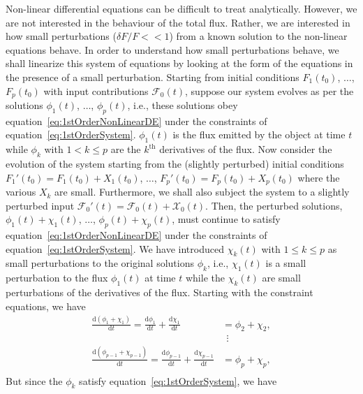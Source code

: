 \documentclass[a4paper,fleqn,usenatbib]{mnras}
\begin{document}
Non-linear differential equations can be difficult to treat analytically. However, we are not interested in the behaviour of the total flux. Rather, we are interested in how small perturbations ($\delta F/F << 1$) from a known solution to the non-linear equations behave. In order to understand how small perturbations behave, we shall linearize this system of equations by looking at the form of the equations in the presence of a small perturbation. Starting from initial conditions $F_{1}(t_{0})$, $\ldots$, $F_{p}(t_{0})$ with input contributions $\mathcal{F}_{0}(t)$, suppose our system evolves as per the solutions $\phi_{1}(t)$, $\ldots$, $\phi_{p}(t)$, i.e., these solutions obey equation~\eqref{eq:1stOrderNonLinearDE} under the constraints of equation~\eqref{eq:1stOrderSystem}. $\phi_{1}(t)$ is the flux emitted by the object at time $t$ while $\phi_{k}$ with $1 < k \leq p$ are the $k^{\mathrm{th}}$ derivatives of the flux. Now consider the evolution of the system starting from the (slightly perturbed) initial conditions $F_{1}'(t_{0}) = F_{1}(t_{0}) + X_{1}(t_{0})$, $\ldots$, $F_{p}'(t_{0}) = F_{p}(t_{0}) + X_{p}(t_{0})$ where the various $X_{k}$ are small. Furthermore, we shall also subject the system to a slightly perturbed input  $\mathcal{F}_{0}'(t) =  \mathcal{F}_{0}(t) +  \mathcal{X}_{0}(t)$. Then, the perturbed solutions, $\phi_{1}(t) + \chi_{1}(t)$, $\ldots$, $\phi_{p}(t) + \chi_{p}(t)$, must continue to satisfy equation~\eqref{eq:1stOrderNonLinearDE} under the constraints of equation~\eqref{eq:1stOrderSystem}. We have introduced $\chi_{k}(t)$ with $1 \leq k \leq p$ as small perturbations to the original solutions $\phi_{k}$, i.e., $\chi_{1}(t)$ is a small perturbation to the flux $\phi_{1}(t)$ at time $t$ while the $\chi_{k}(t)$ are small perturbations of the derivatives of the flux. Starting with the constraint equations, we have
\begin{equation}\label{eq:1stOrderPerturnedSystem}
\begin{aligned}
\frac{\mathrm{d}(\phi_{1} + \chi_{1})}{\mathrm{d}t} = \frac{\mathrm{d}\phi_{1}}{\mathrm{d}t} + \frac{\mathrm{d}\chi_{1}}{\mathrm{d}t} &= \phi_{2} + \chi_{2},\\
&\ \ \vdots \\
\frac{\mathrm{d}(\phi_{p-1} + \chi_{p-1})}{\mathrm{d}t} = \frac{\mathrm{d}\phi_{p-1}}{\mathrm{d}t} + \frac{\mathrm{d}\chi_{p-1}}{\mathrm{d}t} &= \phi_{p} + \chi_{p},\\
\end{aligned}
\end{equation}
But since the $\phi_{k}$ satisfy equation~\eqref{eq:1stOrderSystem}, we have
\end{document}
